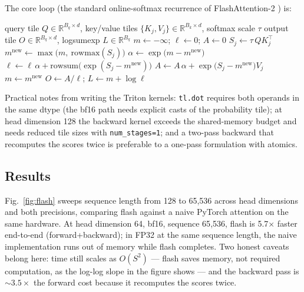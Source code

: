 \documentclass{article}
\begin{document}
The core loop (the standard online-softmax recurrence of FlashAttention-2 \cite{flash2}) is:

\begin{algorithm}[t]
  \caption{FlashAttention forward pass with online softmax, for one query tile.}
  \label{alg:flash}
  \begin{algorithmic}[1]
    \Require query tile $Q \in \mathbb{R}^{B_q \times d}$, key/value tiles $\{K_j, V_j\} \in \mathbb{R}^{B_k \times d}$, softmax scale $\tau$
    \Ensure  output tile $O \in \mathbb{R}^{B_q \times d}$, logsumexp $L \in \mathbb{R}^{B_q}$
    \State $m \gets -\infty$; \quad $\ell \gets 0$; \quad $A \gets 0$ 
      \State $S_j \gets \tau\, Q K_j^{\top}$ 
      \State $m^{\mathrm{new}} \gets \max\bigl(m,\ \mathrm{rowmax}(S_j)\bigr)$
      \State $\alpha \gets \exp\bigl(m - m^{\mathrm{new}}\bigr)$ 
      \State $\ell \gets \ell\,\alpha + \mathrm{rowsum}\bigl(\exp(S_j - m^{\mathrm{new}})\bigr)$
      \State $A \gets A\,\alpha + \exp\bigl(S_j - m^{\mathrm{new}}\bigr) V_j$
      \State $m \gets m^{\mathrm{new}}$
    \EndFor
    \State $O \gets A / \ell$; \quad $L \gets m + \log \ell$ 
  \end{algorithmic}
\end{algorithm}

Practical notes from writing the Triton kernels: \texttt{tl.dot} requires both operands in the same dtype (the bf16 path needs explicit casts of the probability tile); at head dimension 128 the backward kernel exceeds the shared-memory budget and needs reduced tile sizes with \texttt{num\_stages=1}; and a two-pass backward that recomputes the scores twice is preferable to a one-pass formulation with atomics.

\subsection{Results}

Fig.~\ref{fig:flash} sweeps sequence length from 128 to 65{,}536 across head dimensions and both precisions, comparing flash against a naive PyTorch attention on the same hardware. At head dimension 64, bf16, sequence 65{,}536, flash is 5.7$\times$ faster end-to-end (forward+backward); in FP32 at the same sequence length, the naive implementation runs out of memory while flash completes. Two honest caveats belong here: time still scales as $O(S^2)$ --- flash saves memory, not required computation, as the log-log slope in the figure shows --- and the backward pass is ${\sim}3.5\times$ the forward cost because it recomputes the scores twice.
\end{document}
